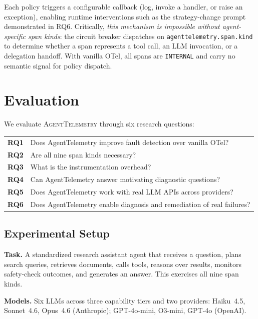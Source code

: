\documentclass[sigplan,10pt,screen]{acmart}
\begin{document}
\noindent
Each policy triggers a configurable callback (log, invoke a handler,
or raise an exception), enabling runtime interventions such as the
strategy-change prompt demonstrated in RQ6.  Critically, \emph{this
mechanism is impossible without agent-specific span kinds}: the circuit
breaker dispatches on \texttt{agenttelemetry.span.kind} to determine
whether a span represents a tool call, an LLM invocation, or a
delegation handoff.  With vanilla OTel, all spans are
\texttt{INTERNAL} and carry no semantic signal for policy dispatch.

\section{Evaluation}
\label{sec:evaluation}

We evaluate \textsc{AgentTelemetry} through six research questions:

\noindent
\begin{tabular}{@{}lp{5.5cm}@{}}
\textbf{RQ1} & Does AgentTelemetry improve fault detection over vanilla OTel? \\
\textbf{RQ2} & Are all nine span kinds necessary? \\
\textbf{RQ3} & What is the instrumentation overhead? \\
\textbf{RQ4} & Can AgentTelemetry answer motivating diagnostic questions? \\
\textbf{RQ5} & Does AgentTelemetry work with real LLM APIs across providers? \\
\textbf{RQ6} & Does AgentTelemetry enable diagnosis and remediation of real failures? \\
\end{tabular}

\subsection{Experimental Setup}

\textbf{Task.}  A standardized research assistant agent that receives a
question, plans search queries, retrieves documents, calls tools,
reasons over results, monitors safety-check outcomes, and generates an
answer.  This exercises all nine span kinds.

\textbf{Models.}  Six LLMs across three capability tiers and two
providers: Haiku~4.5, Sonnet~4.6, Opus~4.6 (Anthropic); GPT-4o-mini,
O3-mini, GPT-4o (OpenAI).
\end{document}

